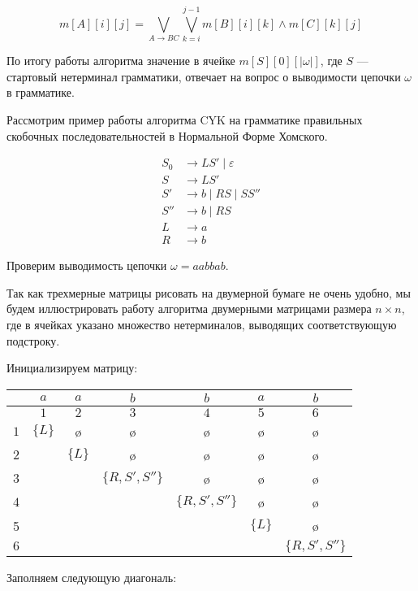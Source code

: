 \[ m[A][i][j] = \bigvee_{A \to B C}^{}{\bigvee_{k=i}^{j-1}{m[B][i][k] \wedge m[C][k][j]}} \]

По итогу работы алгоритма значение в ячейке $m[S][0][|\omega|]$, где $S$ --- стартовый нетерминал грамматики, отвечает на вопрос о выводимости цепочки $\omega$ в грамматике. 

\begin{example}
  Рассмотрим пример работы алгоритма CYK на грамматике правильных скобочных последовательностей в Нормальной Форме Хомского. 

  \begin{align*}
    S_0 &\to L S' \mid \varepsilon \\ 
    S   &\to L S' \\ 
    S'  &\to b \mid R S \mid S S'' \\ 
    S'' &\to b \mid R S \\
    L   &\to a \\ 
    R   &\to b
  \end{align*}
  
Проверим выводимость цепочки $\omega = a a b b a b$.

Так как трехмерные матрицы рисовать на двумерной бумаге не очень удобно, мы будем иллюстрировать работу алгоритма двумерными матрицами размера $n \times n$, где в ячейках указано множество нетерминалов, выводящих соответствующую подстроку. 

Инициализируем матрицу: 

\begin{center}
  \begin{tabular}{c||cc|cc|cc}
    & $a$ & $a$ & $b$ & $b$ & $a$ & $b$ \\ \hline
    & $1$ & $2$ & $3$ & $4$ & $5$ & $6$ \\ \hline \hline
  $1$ & $\{L\}$ & \o & \o & \o & \o & \o \\ 
  $2$ &   & $\{L\}$ & \o & \o & \o & \o \\ \hline
  $3$ &   &   & $\{R, S', S''\}$ & \o & \o & \o \\ 
  $4$ &   &   &   & $\{R, S', S''\}$ & \o & \o \\ \hline
  5 &   &   &   &   & $\{L\}$ & \o \\ 
  $6$ &   &   &   &   &   & $\{R, S', S''\}$
  \end{tabular}
\end{center}

Заполняем следующую диагональ:


\end{example}
